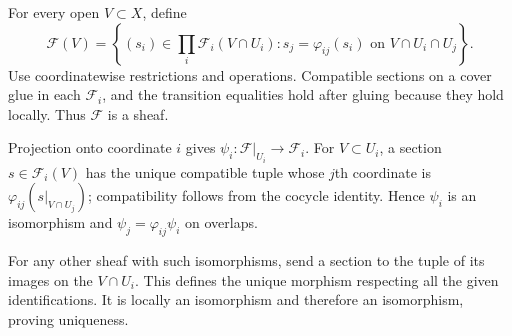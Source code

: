 For every open $V\subset X$, define
\[\mathscr F(V)=\left\{(s_i)\in\prod_i\mathscr F_i(V\cap U_i):s_j=\varphi_{ij}(s_i)\text{ on }V\cap U_i\cap U_j\right\}.\]
Use coordinatewise restrictions and operations. Compatible sections on a cover glue in each $\mathscr F_i$, and the transition equalities hold after gluing because they hold locally. Thus $\mathscr F$ is a sheaf.

Projection onto coordinate $i$ gives $\psi_i:\mathscr F|_{U_i}\to\mathscr F_i$. For $V\subset U_i$, a section $s\in\mathscr F_i(V)$ has the unique compatible tuple whose $j$th coordinate is $\varphi_{ij}(s|_{V\cap U_j})$; compatibility follows from the cocycle identity. Hence $\psi_i$ is an isomorphism and $\psi_j=\varphi_{ij}\psi_i$ on overlaps.

For any other sheaf with such isomorphisms, send a section to the tuple of its images on the $V\cap U_i$. This defines the unique morphism respecting all the given identifications. It is locally an isomorphism and therefore an isomorphism, proving uniqueness.
